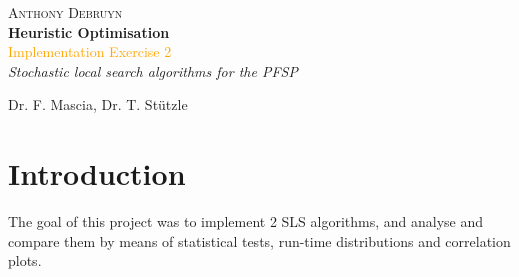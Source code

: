 
\newcommand*{\titleTH}{\begingroup %
\raggedleft %
\vspace*{\baselineskip} %

{\Large \textsc{Anthony Debruyn}}\\[0.167\textheight] %

{\LARGE\bfseries Heuristic Optimisation}\\[\baselineskip] %

{\textcolor{Orange}{\Huge Implementation Exercise 2}}\\[\baselineskip] %

{\Large \textit{Stochastic local search algorithms for the PFSP}}\par %

\vfill %


{\large Dr. F. Mascia, Dr. T. Stützle \course}\par %

\endgroup}


 

\thispagestyle{empty}

\titleTH %

\newpage
\section{Introduction}
The goal of this project was to implement 2 SLS algorithms, and analyse and compare them by means of statistical tests, run-time distributions and correlation plots. 

